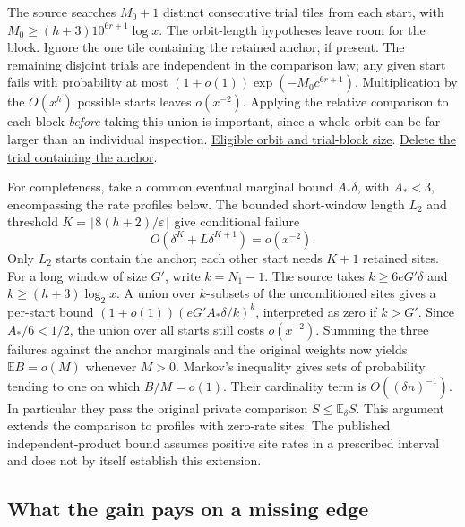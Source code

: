 The source searches \(M_0+1\) distinct consecutive trial tiles from each start, with \(M_0\ge(h+3)10^{6r+1}\log x\). The orbit-length hypotheses leave room for the block. Ignore the one tile containing the retained anchor, if present. The remaining disjoint trials are independent in the comparison law; any given start fails with probability at most \((1+o(1))\exp(-M_0 c^{6r+1})\). Multiplication by the \(O(x^h)\) possible starts leaves \(o(x^{-2})\). Applying the relative comparison to each block \emph{before} taking this union is important, since a whole orbit can be far larger than an individual inspection.
\href{https://github.com/nousentllc/riemann-hypothesis/blob/40e56bab026552e089d7afcfeff08d2defb9c005/src/Development/AutomorphicArithmetic/ThickFrames/orbitTerms.lean#L107-L136}{Eligible orbit and trial-block size}.
\href{https://github.com/nousentllc/riemann-hypothesis/blob/40e56bab026552e089d7afcfeff08d2defb9c005/src/Development/AutomorphicArithmetic/ThickFrames/TilesLe.lean#L43-L67}{Delete the trial containing the anchor}.

For completeness, take a common eventual marginal bound \(A_*\delta\), with \(A_*<3\), encompassing the rate profiles below. The bounded short-window length \(L_2\) and threshold \(K=\lceil8(h+2)/\varepsilon\rceil\) give conditional failure
\[
 O\!\left(\delta^K+L\delta^{K+1}\right)=o(x^{-2}).
\]
Only \(L_2\) starts contain the anchor; each other start needs \(K+1\) retained sites. For a long window of size \(G'\), write \(k=N_1-1\). The source takes \(k\ge6eG'\delta\) and \(k\ge(h+3)\log_2x\). A union over \(k\)-subsets of the unconditioned sites gives a per-start bound \((1+o(1))(eG'A_*\delta/k)^k\), interpreted as zero if \(k>G'\). Since \(A_*/6<1/2\), the union over all starts still costs \(o(x^{-2})\). Summing the three failures against the anchor marginals and the original weights now yields \(\mathbb E B=o(M)\) whenever \(M>0\). Markov's inequality gives sets of probability tending to one on which \(B/M=o(1)\). Their cardinality term is \(O((\delta n)^{-1})\). In particular they pass the original private comparison \(S\le\mathbb E_\delta S\). This argument extends the comparison to profiles with zero-rate sites. The published independent-product bound assumes positive site rates in a prescribed interval and does not by itself establish this extension.

\subsection{What the gain pays on a missing edge}

